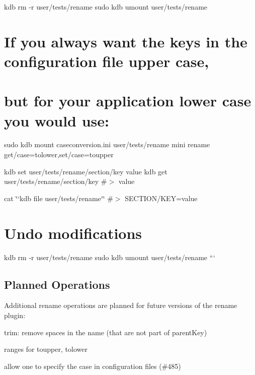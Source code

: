 kdb rm -\/r user/tests/rename sudo kdb umount user/tests/rename 
\begin{DoxyCode}
\end{DoxyCode}
 \section*{If you always want the keys in the configuration file upper case,}

\section*{but for your application lower case you would use\+:}

sudo kdb mount caseconversion.\+ini user/tests/rename mini rename get/case=tolower,set/case=toupper

kdb set user/tests/rename/section/key value kdb get user/tests/rename/section/key \#$>$ value

cat \char`\"{}`kdb file user/tests/rename`\char`\"{} \#$>$ S\+E\+C\+T\+I\+O\+N/\+K\+EY=value

\section*{Undo modifications}

kdb rm -\/r user/tests/rename sudo kdb umount user/tests/rename ```

\subsection*{Planned Operations}

Additional rename operations are planned for future versions of the rename plugin\+:
\begin{DoxyItemize}
\item trim\+: remove spaces in the name (that are not part of parent\+Key)
\item ranges for toupper, tolower
\item allow one to specify the case in configuration files (\#485) 
\end{DoxyItemize}